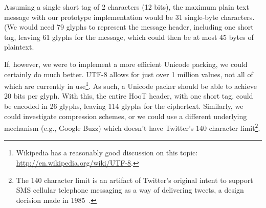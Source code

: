 Assuming a single short tag of 2 characters (12 bits), the maximum plain text message with our prototype implementation would be 31 single-byte characters. (We would need 79 glyphs to represent the message header, including one short tag, leaving 61 glyphs for the message, which could then be at most 45 bytes of plaintext.

If, however, we were to implement a more efficient Unicode packing, we could certainly do much better. UTF-8 allows for just over 1 million values, not all of which are currently in use\footnote{Wikipedia has a reasonably good discussion on this topic: \url{http://en.wikipedia.org/wiki/UTF-8}.}. As such, a Unicode packer should be able to achieve 20 bits per glyph. With this, the entire HooT header, with one short tag, could be encoded in 26 glyphs, leaving 114 glyphs for the ciphertext. Similarly, we could investigate compression schemes, or we could use a different underlying mechanism (e.g., Google Buzz) which doesn't have Twitter's 140 character limit\footnote{The 140 character limit is an artifact of Twitter's original intent to support SMS cellular telephone messaging as a way of delivering tweets, a design decision made in 1985~\cite{latimes-char160}.}.
